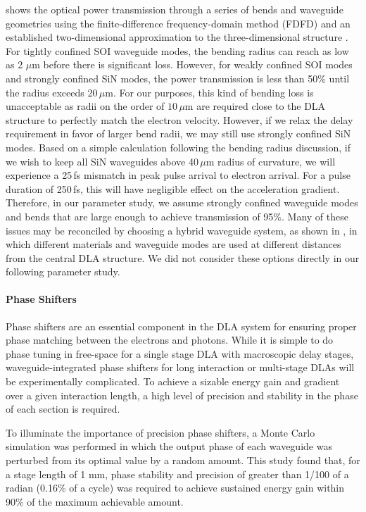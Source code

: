  shows the optical power transmission through a series of bends and waveguide geometries using the finite-difference frequency-domain method (FDFD) \cite{shin2012choice} and an established two-dimensional approximation to the three-dimensional structure \cite{smotrova2005cold}.
For tightly confined SOI waveguide modes, the bending radius can reach as low as 2 $\mu$m before there is significant loss.
However, for weakly confined SOI modes and strongly confined SiN modes, the power transmission is less than 50$\%$ until the radius exceeds 20\,$\mu$m.
For our purposes, this kind of bending loss is unacceptable as radii on the order of $10$\,$\mu$m are required close to the DLA structure to perfectly match the electron velocity.
However, if we relax the delay requirement in favor of larger bend radii, we may still use strongly confined SiN modes.
Based on a simple calculation following the bending radius discussion, if we wish to keep all SiN waveguides above 40\,$\mu$m radius of curvature, we will experience a 25\,fs mismatch in peak pulse arrival to electron arrival.
For a pulse duration of 250\,fs, this will have negligible effect on the acceleration gradient.
Therefore, in our parameter study, we assume strongly confined waveguide modes and bends that are large enough to achieve transmission of 95\%.
Many of these issues may be reconciled by choosing a hybrid waveguide system, as shown in , in which different materials and waveguide modes are used at different distances from the central DLA structure.
We did not consider these options directly in our following parameter study.

\paragraph{Phase Shifters}

Phase shifters are an essential component in the DLA system for ensuring proper phase matching between the electrons and photons.
While it is simple to do phase tuning in free-space for a single stage DLA with macroscopic delay stages, waveguide-integrated phase shifters for long interaction or multi-stage DLAs will be experimentally complicated.
To achieve a sizable energy gain and gradient over a given interaction length, a high level of precision and stability in the phase of each section is required.

To illuminate the importance of precision phase shifters, a Monte Carlo simulation was performed in which the output phase of each waveguide was perturbed from its optimal value by a random amount.
This study found that, for a stage length of 1 mm, phase stability and precision of greater than 1/100 of a radian (0.16\% of a cycle) was required to achieve sustained energy gain within 90\% of the maximum achievable amount.


